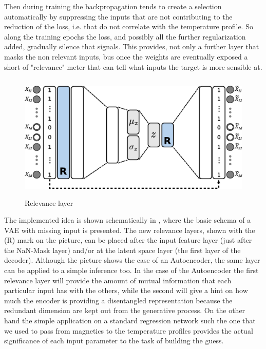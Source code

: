 Then during training the backpropagation tends to create a selection automatically by suppressing the inputs that are not contributing to the reduction of the loss, i.e. that do not correlate with the temperature profile.
So along the training epochs the loss, and possibly all the further regularization added, gradually silence that signals. This provides, not only a further layer that masks the non relevant inputs, bus once the weights are eventually exposed a short of "relevance" meter that can tell what inputs the target is more sensible at.
%
\begin{figure}
    \centering
    \includegraphics[height=6cm]{img/STEP12_7/VAE_RELEVANCE.eps}
    \caption{Relevance layer}
    \label{fig:relevance}
\end{figure}
%
The implemented idea is shown schematically in \Figure{\ref{fig:relevance}}, where the basic schema of a VAE with missing input is presented. The new relevance layers, shown with the (R) mark on the picture, can be placed after the input feature layer (just after the NaN-Mask layer) and/or at the latent space layer (the first layer of the decoder).
Although the picture shows the case of an Autoencoder, the same layer can be applied to a simple inference too.
In the case of the Autoencoder the first relevance layer will provide the amount of mutual information that each particular input has with the others, while the second will give a hint on how much the encoder is providing a disentangled representation because the redundant dimension are kept out from the generative process.
On the other hand the simple application on a standard regression network such the one that we used to pass from magnetics to the temperature profiles provides the actual significance of each input parameter to the task of building the guess.

